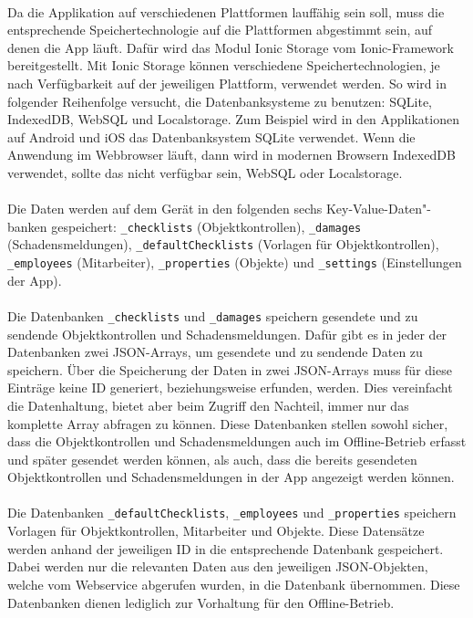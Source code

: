 \documentclass[12pt]{article}
\begin{document}
\paragraph{}Da die Applikation auf verschiedenen Plattformen lauffähig sein soll, muss die entsprechende Speichertechnologie auf die Plattformen abgestimmt sein, auf denen die App läuft. Dafür wird das Modul Ionic Storage vom Ionic-Framework bereitgestellt. Mit Ionic Storage können verschiedene Speichertechnologien, je nach Verfügbarkeit auf der jeweiligen Plattform, verwendet werden. So wird  in folgender Reihenfolge versucht, die Datenbanksysteme zu benutzen: SQLite, IndexedDB, WebSQL und Localstorage. Zum Beispiel wird in den Applikationen auf Android und iOS das Datenbanksystem SQLite verwendet. Wenn die Anwendung im Webbrowser läuft, dann wird in modernen Browsern IndexedDB verwendet, sollte das nicht verfügbar sein, WebSQL oder Localstorage. 

\paragraph{}Die Daten werden auf dem Gerät in den folgenden sechs Key-Value-Daten"-banken gespeichert: \texttt{\_checklists} (Objektkontrollen), \texttt{\_damages} (Schadensmeldungen), \texttt{\_defaultChecklists} (Vorlagen für Objektkontrollen), \texttt{\_employees} (Mitarbeiter), \texttt{\_properties} (Objekte) und \texttt{\_settings} (Einstellungen der App).

\paragraph{}Die Datenbanken \texttt{\_checklists} und \texttt{\_damages} speichern gesendete und zu sendende Objektkontrollen und Schadensmeldungen. Dafür gibt es in jeder der Datenbanken zwei JSON-Arrays, um gesendete und zu sendende Daten zu speichern. Über die Speicherung der Daten in zwei JSON-Arrays muss für diese Einträge keine ID generiert, beziehungsweise erfunden, werden. Dies vereinfacht die Datenhaltung, bietet aber beim Zugriff den Nachteil, immer nur das komplette Array abfragen zu können. Diese Datenbanken stellen sowohl sicher, dass die Objektkontrollen und Schadensmeldungen auch im Offline-Betrieb erfasst und später gesendet werden können, als auch, dass die bereits gesendeten Objektkontrollen und Schadensmeldungen in der App angezeigt werden können.

\paragraph{}Die Datenbanken \texttt{\_defaultChecklists}, \texttt{\_employees} und \texttt{\_properties} speichern Vorlagen für Objektkontrollen, Mitarbeiter und Objekte. Diese Datensätze werden anhand der jeweiligen ID in die entsprechende Datenbank gespeichert. Dabei werden nur die relevanten Daten aus den jeweiligen JSON-Objekten, welche vom Webservice abgerufen wurden, in die Datenbank übernommen. Diese Datenbanken dienen lediglich zur Vorhaltung für den Offline-Betrieb.
\end{document}
